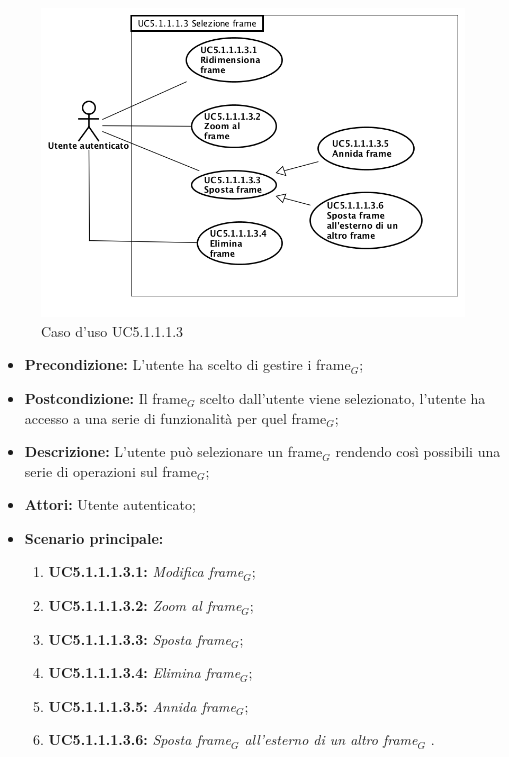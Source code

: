 \begin{figure}[h]
	\begin{center}
	\includegraphics[scale=0.4]{diagram/UC5-1-1-1-3.png}
	\caption{Caso d'uso UC5.1.1.1.3}
	\end{center}
\end{figure}
\begin{itemize}
	\item \textbf{Precondizione:} L'utente ha scelto di gestire i frame$_G$;
	\item \textbf{Postcondizione:} Il frame$_G$ scelto dall'utente viene selezionato, l'utente ha accesso a una serie di funzionalità per quel frame$_G$;
	\item \textbf{Descrizione:} L'utente può selezionare un frame$_G$ rendendo così possibili una serie di operazioni sul frame$_G$;
	\item \textbf{Attori:} Utente autenticato;
	\item \textbf{Scenario principale:}
	\begin{enumerate}
		\item \textbf{ UC5.1.1.1.3.1:} \textit{ Modifica frame$_G$};
		\item \textbf{ UC5.1.1.1.3.2:} \textit{ Zoom al frame$_G$};
		\item \textbf{ UC5.1.1.1.3.3:} \textit{ Sposta frame$_G$};
		\item \textbf{ UC5.1.1.1.3.4:} \textit{ Elimina frame$_G$};
		\item \textbf{ UC5.1.1.1.3.5:} \textit{ Annida frame$_G$};
		\item \textbf{ UC5.1.1.1.3.6:} \textit{ Sposta frame$_G$ all'esterno di un altro frame$_G$  }.
	\end{enumerate}
\end{itemize}
